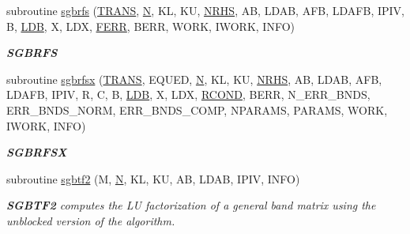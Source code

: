 \begin{DoxyCompactItemize}
subroutine \hyperlink{group__realGBcomputational_ga7f306ebeac9cac6e32fb0d3092d336aa}{sgbrfs} (\hyperlink{superlu__enum__consts_8h_a0c4e17b2d5cea33f9991ccc6a6678d62a1f61e3015bfe0f0c2c3fda4c5a0cdf58}{T\+R\+A\+N\+S}, \hyperlink{polmisc_8c_a0240ac851181b84ac374872dc5434ee4}{N}, K\+L, K\+U, \hyperlink{example__user_8c_aa0138da002ce2a90360df2f521eb3198}{N\+R\+H\+S}, A\+B, L\+D\+A\+B, A\+F\+B, L\+D\+A\+F\+B, I\+P\+I\+V, B, \hyperlink{example__user_8c_a50e90a7104df172b5a89a06c47fcca04}{L\+D\+B}, X, L\+D\+X, \hyperlink{superlu__enum__consts_8h_af00a42ecad444bbda75cde1b64bd7e72a78fd14d7abebae04095cfbe02928f153}{F\+E\+R\+R}, B\+E\+R\+R, W\+O\+R\+K, I\+W\+O\+R\+K, I\+N\+F\+O)
\begin{DoxyCompactList}\small\item\em {\bfseries S\+G\+B\+R\+F\+S} \end{DoxyCompactList}\item 
subroutine \hyperlink{group__realGBcomputational_ga4b997132d5e41418449796f85b12fcc5}{sgbrfsx} (\hyperlink{superlu__enum__consts_8h_a0c4e17b2d5cea33f9991ccc6a6678d62a1f61e3015bfe0f0c2c3fda4c5a0cdf58}{T\+R\+A\+N\+S}, E\+Q\+U\+E\+D, \hyperlink{polmisc_8c_a0240ac851181b84ac374872dc5434ee4}{N}, K\+L, K\+U, \hyperlink{example__user_8c_aa0138da002ce2a90360df2f521eb3198}{N\+R\+H\+S}, A\+B, L\+D\+A\+B, A\+F\+B, L\+D\+A\+F\+B, I\+P\+I\+V, R, C, B, \hyperlink{example__user_8c_a50e90a7104df172b5a89a06c47fcca04}{L\+D\+B}, X, L\+D\+X, \hyperlink{superlu__enum__consts_8h_af00a42ecad444bbda75cde1b64bd7e72a9b5c151728d8512307565994c89919d5}{R\+C\+O\+N\+D}, B\+E\+R\+R, N\+\_\+\+E\+R\+R\+\_\+\+B\+N\+D\+S, E\+R\+R\+\_\+\+B\+N\+D\+S\+\_\+\+N\+O\+R\+M, E\+R\+R\+\_\+\+B\+N\+D\+S\+\_\+\+C\+O\+M\+P, N\+P\+A\+R\+A\+M\+S, P\+A\+R\+A\+M\+S, W\+O\+R\+K, I\+W\+O\+R\+K, I\+N\+F\+O)
\begin{DoxyCompactList}\small\item\em {\bfseries S\+G\+B\+R\+F\+S\+X} \end{DoxyCompactList}\item 
subroutine \hyperlink{group__realGBcomputational_ga0bcc0fe084053d5fb44740646a0abcb9}{sgbtf2} (M, \hyperlink{polmisc_8c_a0240ac851181b84ac374872dc5434ee4}{N}, K\+L, K\+U, A\+B, L\+D\+A\+B, I\+P\+I\+V, I\+N\+F\+O)
\begin{DoxyCompactList}\small\item\em {\bfseries S\+G\+B\+T\+F2} computes the L\+U factorization of a general band matrix using the unblocked version of the algorithm. \end{DoxyCompactList}\item 

\end{DoxyCompactItemize}
